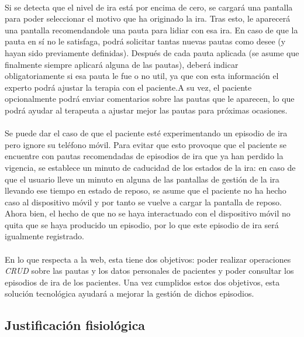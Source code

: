 \paragraph{}
Si se detecta que el nivel de ira está por encima de cero, se cargará una pantalla para poder seleccionar el motivo que ha originado la ira. Tras esto, le aparecerá una pantalla recomendandole una pauta para lidiar con esa ira. En caso de que la pauta en sí no le satisfaga, podrá solicitar tantas nuevas pautas como desee (y hayan sido previamente definidas). Después de cada pauta aplicada (se asume que finalmente siempre aplicará alguna de las pautas), deberá indicar obligatoriamente si esa pauta le fue o no util, ya que con esta información el experto podrá ajustar la terapia con el paciente.A su vez, el paciente opcionalmente podrá enviar comentarios sobre las pautas que le aparecen, lo que podrá ayudar al terapeuta a ajustar mejor las pautas para próximas ocasiones.

\paragraph{}
Se puede dar el caso de que el paciente esté experimentando un episodio de ira pero ignore su teléfono móvil. Para evitar que esto provoque que el paciente se encuentre con pautas recomendadas de episodios de ira que ya han perdido la vigencia, se establece un minuto de caducidad de los estados de la ira: en caso de que el usuario lleve un minuto en alguna de las pantallas de gestión de la ira llevando ese tiempo en estado de reposo, se asume que el paciente no ha hecho caso al dispositivo móvil y por tanto se vuelve a cargar la pantalla de reposo. Ahora bien, el hecho de que no se haya interactuado con el dispositivo móvil no quita que se haya producido un episodio, por lo que este episodio de ira será igualmente registrado.

\paragraph{}
En lo que respecta a la web, esta tiene dos objetivos: poder realizar operaciones \textit{CRUD} sobre las pautas y los datos personales de pacientes y poder consultar los episodios de ira de los pacientes. Una vez cumplidos estos dos objetivos, esta solución tecnológica ayudará a mejorar la gestión de dichos episodios.

\subsection{Justificación fisiológica}
